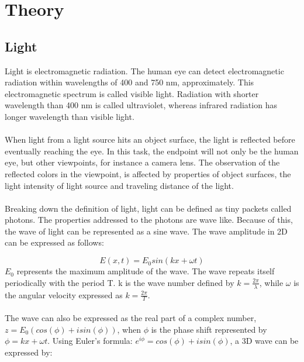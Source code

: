 \chapter{Theory}
\label{chap:theory}



\section{Light} \label{sec:light}
Light is electromagnetic radiation. The human eye can detect electromagnetic radiation within wavelengths of 400 and 750 nm, approximately. This electromagnetic spectrum is called visible light. Radiation with shorter wavelength than 400 nm is called ultraviolet, whereas infrared radiation has longer wavelength than visible light.
\\\\
When light from a light source hits an object surface, the light is reflected before eventually reaching the eye. In this task, the endpoint will not only be the human eye, but other viewpoints, for instance a camera lens. The observation of the reflected colors in the viewpoint, is affected by properties of object surfaces, the light intensity of light source and traveling distance of the light.
\\\\
Breaking down the definition of light, light can be defined as tiny packets called photons. The properties addressed to the photons are wave like. Because of this, the wave of light can be represented as a sine wave. The wave amplitude in 2D can be expressed as follows: 

\begin{equation}
    E(x,t) = E_0 sin(kx+\omega t)
    \label{eq:aml2d}
\end{equation}
$E_0$ represents the maximum amplitude of the wave. The wave repeats itself periodically with the period T. k is the wave number defined by $k= \frac{2 \pi}{\lambda}$, while $\omega$ is the angular velocity expressed as $k= \frac{2 \pi}{T}$.
\\\\
The wave can also be expressed as the real part of a complex number, $z = E_0(cos(\phi) + i sin(\phi))$, when $\phi$ is the phase shift represented by $\phi = kx + \omega t$. Using Euler's formula: $e^{i \phi} = cos(\phi) + i sin(\phi)$, a 3D wave can be expressed by: 

